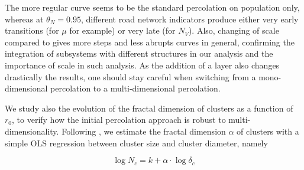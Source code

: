 \documentclass{jimis-en}
\begin{document}
The more regular curve seems to be the standard percolation on population only, whereas at $\theta_N = 0.95$, different road network indicators produce either very early transitions (for $\mu$ for example) or very late (for $N_V$). Also, changing of scale compared to \cite{arcaute2016cities} gives more steps and less abrupts curves in general, confirming the integration of subsystems with different structures in our analysis and the importance of scale in such analysis. As the addition of a layer also changes drastically the results, one should stay careful when switching from a mono-dimensional percolation to a multi-dimensional percolation.







We study also the evolution of the fractal dimension of clusters as a function of $r_0$, to verify how the initial percolation approach is robust to multi-dimensionality. Following \cite{arcaute2016cities}, we estimate the fractal dimension $\alpha$ of clusters with a simple OLS regression between cluster size and cluster diameter, namely 

\begin{equation}
\log N_c = k + \alpha \cdot \log \delta_c
\end{equation}
\end{document}
